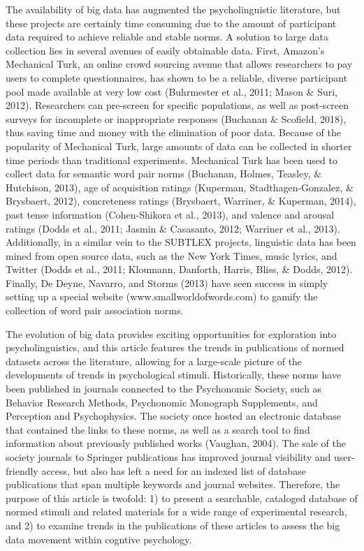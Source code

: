 \documentclass[english,man]{apa6}
\theoremstyle{definition}
\theoremstyle{definition}
\theoremstyle{definition}
\theoremstyle{remark}
\begin{document}
The availability of big data has augmented the psycholinguistic
literature, but these projects are certainly time consuming due to the
amount of participant data required to achieve reliable and stable
norms. A solution to large data collection lies in several avenues of
easily obtainable data. First, Amazon's Mechanical Turk, an online crowd
sourcing avenue that allows researchers to pay users to complete
questionnaires, has shown to be a reliable, diverse participant pool
made available at very low cost (Buhrmester et al., 2011; Mason \& Suri,
2012). Researchers can pre-screen for specific populations, as well as
post-screen surveys for incomplete or inappropriate responses (Buchanan
\& Scofield, 2018), thus saving time and money with the elimination of
poor data. Because of the popularity of Mechanical Turk, large amounts
of data can be collected in shorter time periods than traditional
experiments. Mechanical Turk has been used to collect data for semantic
word pair norms (Buchanan, Holmes, Teasley, \& Hutchison, 2013), age of
acquisition ratings (Kuperman, Stadthagen-Gonzalez, \& Brysbaert, 2012),
concreteness ratings (Brysbaert, Warriner, \& Kuperman, 2014), past
tense information (Cohen-Shikora et al., 2013), and valence and arousal
ratings (Dodds et al., 2011; Jasmin \& Casasanto, 2012; Warriner et al.,
2013). Additionally, in a similar vein to the SUBTLEX projects,
linguistic data has been mined from open source data, such as the New
York Times, music lyrics, and Twitter (Dodds et al., 2011; Kloumann,
Danforth, Harris, Bliss, \& Dodds, 2012). Finally, De Deyne, Navarro,
and Storms (2013) have seen success in simply setting up a special
website (www.smallworldofwords.com) to gamify the collection of word
pair association norms.

The evolution of big data provides exciting opportunities for
exploration into psycholinguistics, and this article features the trends
in publications of normed datasets across the literature, allowing for a
large-scale picture of the developments of trends in psychological
stimuli. Historically, these norms have been published in journals
connected to the Psychonomic Society, such as Behavior Research Methods,
Psychonomic Monograph Supplements, and Perception and Psychophysics. The
society once hosted an electronic database that contained the links to
these norms, as well as a search tool to find information about
previously published works (Vaughan, 2004). The sale of the society
journals to Springer publications has improved journal visibility and
user-friendly access, but also has left a need for an indexed list of
database publications that span multiple keywords and journal websites.
Therefore, the purpose of this article is twofold: 1) to present a
searchable, cataloged database of normed stimuli and related materials
for a wide range of experimental research, and 2) to examine trends in
the publications of these articles to assess the big data movement
within cogntive psychology.
\end{document}
